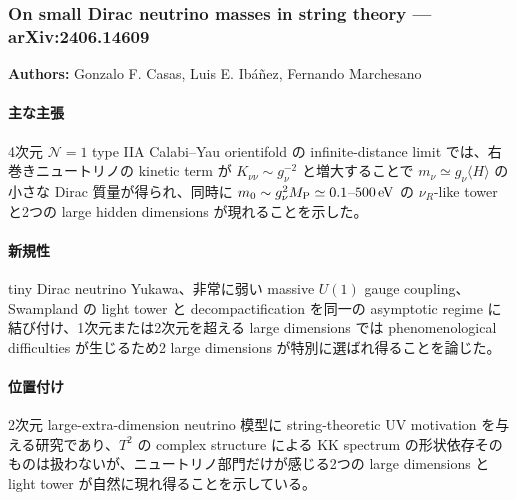 \subsubsection{On small Dirac neutrino masses in string theory --- arXiv:2406.14609}

\textbf{Authors:} Gonzalo F. Casas, Luis E. Ibáñez, Fernando Marchesano

\paragraph{主な主張}
4次元 $\mathcal{N}=1$ type IIA Calabi--Yau orientifold の infinite-distance limit では、右巻きニュートリノの kinetic term が $K_{\nu\nu}\sim g_\nu^{-2}$ と増大することで $m_\nu\simeq g_\nu\langle H\rangle$ の小さな Dirac 質量が得られ、同時に $m_0\sim g_\nu^2M_{\rm P}\simeq0.1$--$500\,{\rm eV}$ の $\nu_R$-like tower と2つの large hidden dimensions が現れることを示した\cite{Casas:2024Dirac}。

\paragraph{新規性}
tiny Dirac neutrino Yukawa、非常に弱い massive $U(1)$ gauge coupling、Swampland の light tower と decompactification を同一の asymptotic regime に結び付け、1次元または2次元を超える large dimensions では phenomenological difficulties が生じるため2 large dimensions が特別に選ばれ得ることを論じた。

\paragraph{位置付け}
2次元 large-extra-dimension neutrino 模型に string-theoretic UV motivation を与える研究であり、$T^2$ の complex structure による KK spectrum の形状依存そのものは扱わないが、ニュートリノ部門だけが感じる2つの large dimensions と light tower が自然に現れ得ることを示している。
